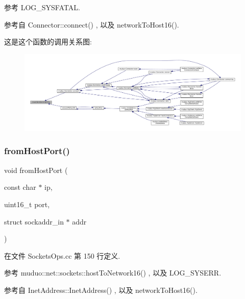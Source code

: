 参考 L\+O\+G\+\_\+\+S\+Y\+S\+F\+A\+T\+AL.



参考自 Connector\+::connect() , 以及 network\+To\+Host16().

这是这个函数的调用关系图\+:
\nopagebreak
\begin{figure}[H]
\begin{center}
\leavevmode
\includegraphics[width=350pt]{namespacemuduo_1_1sockets_a91269e56d86b2e78e693b330e5c665aa_icgraph}
\end{center}
\end{figure}
\mbox{\label{namespacemuduo_1_1sockets_ae40b8bfde260835c9034bfaea0fb4ee0}} 
\subsubsection{\texorpdfstring{from\+Host\+Port()}{fromHostPort()}}
{\footnotesize\ttfamily void from\+Host\+Port (\begin{DoxyParamCaption}\item[{const char $\ast$}]{ip,  }\item[{uint16\+\_\+t}]{port,  }\item[{struct sockaddr\+\_\+in $\ast$}]{addr }\end{DoxyParamCaption})}



在文件 Sockets\+Ops.\+cc 第 150 行定义.



参考 muduo\+::net\+::sockets\+::host\+To\+Network16() , 以及 L\+O\+G\+\_\+\+S\+Y\+S\+E\+RR.



参考自 Inet\+Address\+::\+Inet\+Address() , 以及 network\+To\+Host16().

